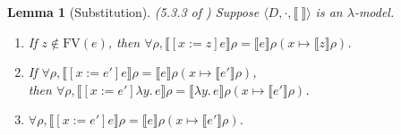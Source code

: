 \documentclass{tufte-handout}
\newcommand{\SEM}[1]{\llbracket #1 \rrbracket}
\newcommand{\LAM}[1]{\lambda #1.\,}
\newcommand{\by}[0]{\!:=\!}
\newcommand{\ext}[3]{#3(#1{\mapsto}#2)}
\newtheorem{lemma}[theorem]{Lemma}
\begin{document}
\begin{lemma}[Substitution] (5.3.3 of \citet{barendregt84:_lambda_calculus} )
\label{lem:subst-model}
  Suppose $\langle D,\cdot, \SEM{\ } \rangle$ is an $\lambda$-model.
  \begin{enumerate}
  \item If $z \notin \mathrm{FV}(e)$, then
      $\forall \rho, \SEM{ [x\by z]e } \rho = \SEM{e}\ext{x}{\SEM{z}\rho}{\rho}$.
  \item If $\forall \rho, \SEM{ [x\by e']e} \rho = \SEM{e}\ext{x}{\SEM{e'}\rho}{\rho}$, \\
    then $\forall \rho, \SEM{ [x\by e']\LAM{y}e} \rho = \SEM{\LAM{y}e}\ext{x}{\SEM{e'}\rho}{\rho}$.
  \item $\forall \rho, \SEM{ [x\by e']e} \rho = \SEM{e}\ext{x}{\SEM{e'}\rho}{\rho}$.
  \end{enumerate}
\end{lemma}
\end{document}
